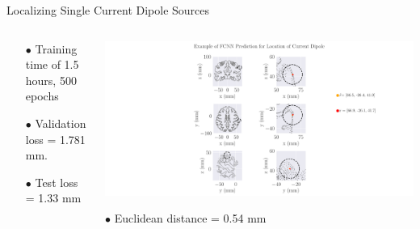 \documentclass[aspectratio=169, 9pt]{beamer}
\begin{document}
\begin{frame}{Localizing Single Current Dipole Sources}
  \begin{columns}
    \begin{column}{0.5\textwidth}
      \begin{itemize}
        \item[$\bullet$] Training time of 1.5 hours, 500 epochs
        \item[$\bullet$] Validation loss = 1.781 mm.
        \item[$\bullet$] Test loss = 1.33 mm
    \end{itemize}
    \end{column}

    \begin{column}{0.5\textwidth}
      \includegraphics[width=1.0\textwidth]{figures/FFNN_single_dipole_prediction.pdf}
      \item[$\bullet$] Euclidean distance = 0.54 mm
    \end{column}

  \end{columns}
\end{frame}
\end{document}
